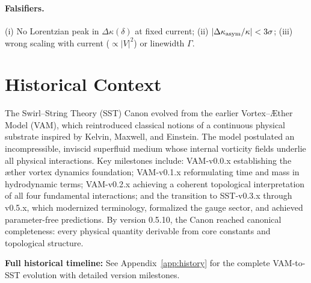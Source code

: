 \documentclass[10pt,reprint,aps,onecolumn,nofootinbib]{revtex4-2}
\begin{document}
    \paragraph{Falsifiers.} (i) No Lorentzian peak in $\Delta\kappa(\delta)$ at fixed current; (ii) $|\Delta\kappa_{\rm asym}/\kappa|<3\sigma$; (iii) wrong scaling with current ($\propto |V|^2$) or linewidth $\Gamma$.


    \section{Historical Context}
    \label{sec:HistoryEvolution}

    The Swirl--String Theory (SST) Canon evolved from the earlier Vortex--Æther Model (VAM), which reintroduced classical notions of a continuous physical substrate inspired by Kelvin, Maxwell, and Einstein. The model postulated an incompressible, inviscid superfluid medium whose internal vorticity fields underlie all physical interactions. Key milestones include: VAM-v0.0.x establishing the æther vortex dynamics foundation; VAM-v0.1.x reformulating time and mass in hydrodynamic terms; VAM-v0.2.x achieving a coherent topological interpretation of all four fundamental interactions; and the transition to SST-v0.3.x through v0.5.x, which modernized terminology, formalized the gauge sector, and achieved parameter-free predictions. By version 0.5.10, the Canon reached canonical completeness: every physical quantity derivable from core constants and topological structure.

    \textbf{Full historical timeline:} See Appendix~\ref{app:history} for the complete VAM-to-SST evolution with detailed version milestones.




\end{document}
